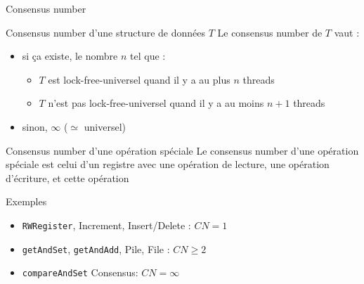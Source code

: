 
\begingroup

\begin{frame}{Consensus number}
  \begin{block}{Consensus number d'une structure de données $T$}
    Le consensus number de $T$ vaut :
    \begin{itemize}
    \item si ça existe, le nombre $n$ tel que : 
      \begin{itemize}
      \item $T$ est lock-free-universel quand il y a au plus $n$ threads%
      \item $T$ n'est pas lock-free-universel quand il y a au moins $n+1$ threads%
      \end{itemize}
    \item sinon, $\infty$ ($\simeq$ universel)
    \end{itemize}
  \end{block}
  
  \begin{block}{Consensus number d'une opération spéciale}
    Le consensus number d'une opération spéciale est celui d'un registre
    avec une opération de lecture, une opération d'écriture, et cette opération
  \end{block}
  
  \begin{exampleblock}{Exemples}
    \begin{itemize}
    \item \lstinline{RWRegister}, Increment, Insert/Delete : $CN = 1$
    \item \lstinline{getAndSet}, \lstinline{getAndAdd}, Pile, File : $CN \ge 2$
    \item \lstinline{compareAndSet} Consensus: $CN = \infty$
    \end{itemize}
  \end{exampleblock}
\end{frame}

\endgroup
\endinput
